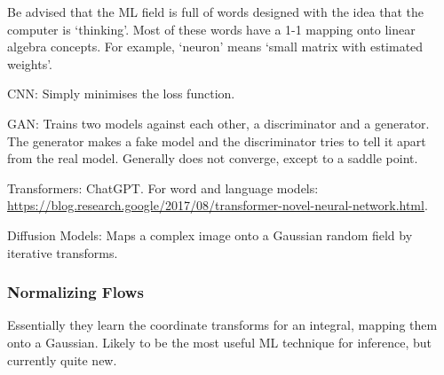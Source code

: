 \documentclass[12pt]{article}
\begin{document}
Be advised that the ML field is full of words designed with the idea that the computer is `thinking'. Most of these words have a 1-1 mapping onto linear algebra concepts. For example, `neuron' means `small matrix with estimated weights'.

CNN: Simply minimises the loss function.

GAN: Trains two models against each other, a discriminator and a generator. The generator makes a fake model and the discriminator tries to tell it apart from the real model. Generally does not converge, except to a saddle point.

Transformers: ChatGPT. For word and language models: \url{https://blog.research.google/2017/08/transformer-novel-neural-network.html}.

Diffusion Models: Maps a complex image onto a Gaussian random field by iterative transforms.

\subsubsection{Normalizing Flows}

Essentially they learn the coordinate transforms for an integral, mapping them onto a Gaussian. Likely to be the most useful ML technique for inference, but currently quite new.
\end{document}
